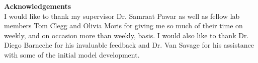 
\mbox{}\newline\vspace{10mm} \mbox{}\LARGE
%
{\bf Acknowledgements} \normalsize \vspace{-8mm}\\
I would like to thank my supervisor Dr. Samraat Pawar as well as fellow lab members Tom Clegg and Olivia Moris for giving me so much of their time on weekly, and on occasion more than weekly, basis.  I would also like to thank Dr. Diego Barneche for his invaluable feedback and Dr. Van Savage for his assistance with some of the initial model development.





